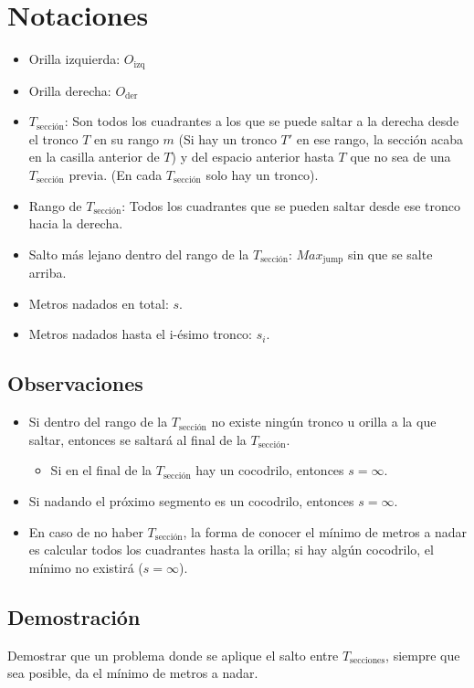 \documentclass{article}
\begin{document}
\section*{Notaciones}
\begin{itemize}
    \item Orilla izquierda: $O_{\text{izq}}$ 
    \item Orilla derecha: $O_{\text{der}}$
    \item $T_{\text{sección}}$: Son todos los cuadrantes a los que se puede saltar a la derecha desde el tronco $T$ en su rango $m$ (Si hay un tronco $T'$ en ese rango, la sección acaba en la casilla anterior de $T$) y del espacio anterior hasta $T$ que no sea de una $T_{\text{sección}}$ previa. (En cada $T_{\text{sección}}$ solo hay un tronco).
    \item Rango de $T_{\text{sección}}$: Todos los cuadrantes que se pueden saltar desde ese tronco hacia la derecha.
    \item Salto más lejano dentro del rango de la $T_{\text{sección}}$: $Max_{\text{jump}}$ sin que se salte arriba.
    \item Metros nadados en total: $s$.
    \item Metros nadados hasta el i-ésimo tronco: $s_i$.
\end{itemize}

\subsection*{Observaciones}
\begin{itemize}
    \item Si dentro del rango de la $T_{\text{sección}}$ no existe ningún tronco u orilla a la que saltar, entonces se saltará al final de la $T_{\text{sección}}$. 
        \begin{itemize}
            \item Si en el final de la $T_{\text{sección}}$ hay un cocodrilo, entonces $s = \infty$.
        \end{itemize}
    \item Si nadando el próximo segmento es un cocodrilo, entonces $s = \infty$. 
    \item En caso de no haber $T_{\text{sección}}$, la forma de conocer el mínimo de metros a nadar es calcular todos los cuadrantes hasta la orilla; si hay algún cocodrilo, el mínimo no existirá ($s = \infty$).
\end{itemize}

\subsection*{Demostración}
Demostrar que un problema donde se aplique el salto entre $T_{\text{secciones}}$, siempre que sea posible, da el mínimo de metros a nadar.
\end{document}
